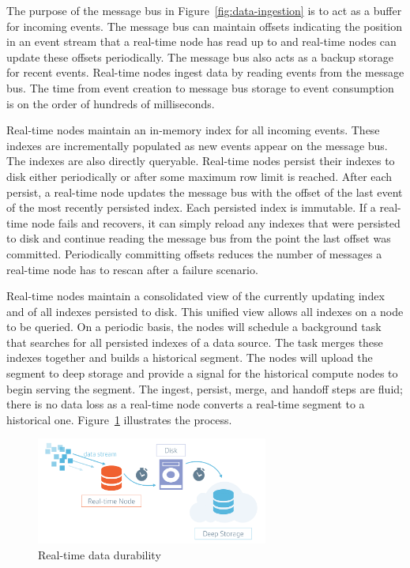 \documentclass{vldb}
\begin{document}
The purpose of the message bus in Figure~\ref{fig:data-ingestion} is to act as a buffer for
incoming events. The message bus can maintain offsets indicating the
position in an event stream that a real-time node has read up to and
real-time nodes can update these offsets periodically. The message bus also acts as a backup storage for recent events.
Real-time nodes ingest data by reading events from the message bus. The time from event creation to message bus storage to
event consumption is on the order of hundreds of milliseconds.

Real-time nodes maintain an in-memory index for all incoming
events. These indexes are incrementally populated as new events appear on the message bus. The indexes are also directly queryable.
Real-time nodes persist their indexes to disk either periodically or after some maximum row limit is
reached. After each persist, a real-time node updates the message bus
with the offset of the last event of the most recently persisted
index. Each persisted index is immutable. If a real-time node fails and recovers, it can simply reload
any indexes that were persisted to disk and continue reading the
message bus from the point the last offset was committed. Periodically committing offsets reduces the number of messages a real-time
node has to rescan after a failure scenario.

Real-time nodes maintain a consolidated view of the currently updating
index and of all indexes persisted to disk. This unified view allows
all indexes on a node to be queried. On a periodic basis, the nodes will
schedule a background task that searches for all persisted indexes of
a data source. The task merges these indexes together and builds a
historical segment. The nodes will upload the segment to deep storage
and provide a signal for the historical compute nodes to begin serving
the segment. The ingest, persist, merge, and handoff steps are fluid;
there is no data loss as a real-time node converts a real-time segment
to a historical one. Figure~\ref{fig:data-durability} illustrates the process.

\begin{figure}
\centering
\includegraphics[width = 3in]{druid_realtime_flow}
\caption{Real-time data durability}
\label{fig:data-durability}
\end{figure}
\end{document}
